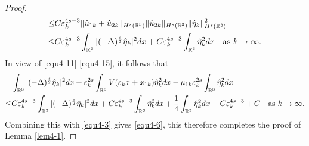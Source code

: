 \documentclass[reqno, 11pt]{amsart} %
\numberwithin{equation}{section}
\begin{document}
\begin{proof}
\begin{equation}
\begin{split}
				\leq&C\varepsilon_{k}^{4s-3}\|\hat{u}_{1k}+\hat{u}_{2k}\|_{H^{s}(\mathbb{R}^{3})}\|\hat{u}_{2k}\|_{H^{s}(\mathbb{R}^{3})}\|\hat{\eta}_{k}\|_{H^{s}(\mathbb{R}^{3})}^{2}\\
				\leq&C\varepsilon_{k}^{4s-3}\int_{\mathbb{R}^{3}}|(-\Delta)^{\frac{s}{2}}\hat{\eta}_{k}|^{2}dx+C\varepsilon_{k}^{4s-3}\int_{\mathbb{R}^{3}}\hat{\eta}_{k}^{2}dx\quad \hbox{as $k\rightarrow\infty$}.
			\end{split}
		\end{equation}
		In view of \eqref{equ4-11}-\eqref{equ4-15}, it follows that
		\begin{align*} 
			&\int_{\mathbb{R}^{3}}|(-\Delta)^{\frac{s}{2}}\hat{\eta}_{k}|^{2}dx+\varepsilon_{k}^{2s}\int_{\mathbb{R}^{3}}V(\varepsilon_{k}x+x_{1k})\hat{\eta}_{k}^{2}dx-\mu_{1k}\varepsilon_{k}^{2s}\int_{\mathbb{R}^{3}}\hat{\eta}_{k}^{2}dx\\
			\leq&C\varepsilon_{k}^{4s-3}\int_{\mathbb{R}^{3}}|(-\Delta)^{\frac{s}{2}}\hat{\eta}_{k}|^{2}dx+C\varepsilon_{k}^{4s-3}\int_{\mathbb{R}^{3}}\hat{\eta}_{k}^{2}dx+\frac{1}{4}\int_{\mathbb{R}^{3}}\hat{\eta}_{k}^{2}dx+C\varepsilon_{k}^{4s-3}+C\quad \hbox{as $k\rightarrow\infty$}.
		\end{align*}
		Combining this with \eqref{equ4-3} gives \eqref{equ4-6}, this therefore completes the proof of Lemma \ref{lem4-1}.
	\end{proof}
	
\end{document}
